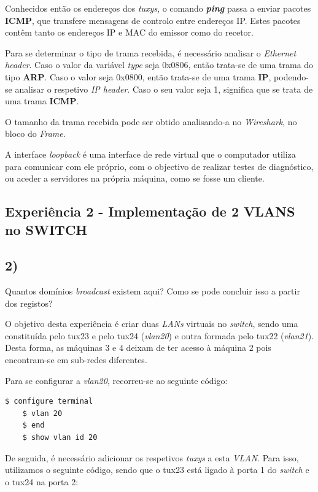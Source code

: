 \documentclass[11pt]{article}
\begin{document}
Conhecidos então os endereços dos \textit{tuxys}, o comando \textit{\textbf{ping}} passa a enviar pacotes \textbf{ICMP}, que transfere mensagens de controlo entre endereços IP. Estes pacotes contêm tanto os endereços IP e MAC do emissor como do recetor.

Para se determinar o tipo de trama recebida, é necessário analisar o \textit{Ethernet header}. Caso o valor da variável \textit{type} seja 0x0806, então trata-se de uma trama do tipo \textbf{ARP}. Caso o valor seja 0x0800, então trata-se de uma trama \textbf{IP}, podendo-se analisar o respetivo \textit{IP header}. Caso o seu valor seja 1, significa que se trata de uma trama \textbf{ICMP}.

O tamanho da trama recebida pode ser obtido analisando-a no \textit{Wireshark}, no bloco do \textit{Frame}.

A interface \textit{loopback} é uma interface de rede virtual que o computador utiliza para comunicar com ele próprio, com o objectivo de realizar testes de diagnóstico, ou aceder a servidores na própria máquina, como se fosse um cliente.

\subsection{Experiência 2 - Implementação de 2 VLANS no SWITCH}

\subsection{2)} Quantos domínios \emph{broadcast} existem aqui? Como se pode concluir isso a partir dos registos?

O objetivo desta experiência é criar duas \textit{LANs} virtuais no \textit{switch}, sendo uma constituída pelo tux23 e pelo tux24 (\textit{vlan20}) e outra formada pelo tux22 (\textit{vlan21}). Desta forma, as máquinas 3 e 4 deixam de ter acesso à máquina 2 pois encontram-se em sub-redes diferentes.

Para se configurar a \textit{vlan20}, recorreu-se ao seguinte código: 

\begin{lstlisting}[language=bash]
    $ configure terminal
    $ vlan 20
    $ end
    $ show vlan id 20
\end{lstlisting}

De seguida, é necessário adicionar os respetivos \textit{tuxys} a esta \textit{VLAN}. Para isso, utilizamos o seguinte código, sendo que o tux23 está ligado à porta 1 do \textit{switch} e o tux24 na porta 2:
\end{document}
